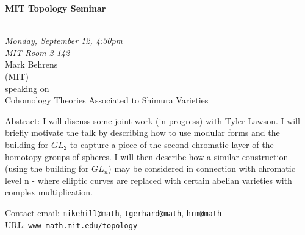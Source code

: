 \documentclass{slides}
\begin{document}
\begin{center}

{\fontsize {54pt}{40pt}\selectfont

\textrm{
{\textbf{MIT Topology Seminar}}}
}\\
\vspace{1cm}
{\large\textrm{\emph{Monday, September 12, 4:30pm\\MIT Room 2-142}}}\\
\vspace{1cm}
\textrm{{\LARGE Mark Behrens  \\[.5cm](MIT)}}\\
\vspace{1cm} %
\textrm{speaking on}\\ %
\vspace{5mm}
\textrm{{\LARGE Cohomology Theories Associated to Shimura Varieties}}\\
\end{center}
\vspace{1cm}
{\small
Abstract:  I will discuss some joint work (in progress) with Tyler Lawson.  I
will briefly motivate the talk by describing how to use modular forms
and the building for $GL_2$ to capture a piece of the second chromatic
layer of the homotopy groups of spheres.  I will then describe how a
similar construction (using the building for $GL_n$) may be considered
in connection with chromatic level n - where elliptic curves are
replaced with certain abelian varieties with complex multiplication.

\textrm{Contact email: } \texttt{mikehill@math}, \texttt{tgerhard@math},
\texttt{hrm@math}\\
\textrm{URL: } \texttt{www-math.mit.edu/topology}
}
\end{document}
